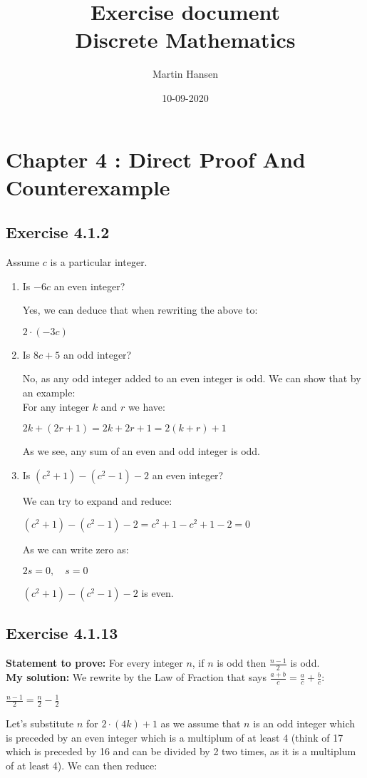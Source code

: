 \documentclass{article}
\author{Martin Hansen}
\date{10-09-2020}
\title{Exercise document \\ \small Discrete Mathematics}
\newcommand{\cent}[1]{\begin{center}#1\end{center}}
\newcommand{\Prove}{\textbf{Statement to prove: }}
\newcommand{\Solution}{\textbf{My solution: }}
\newcommand{\Exercise}[1]{\subsection{Exercise #1}}
\begin{document}
	\maketitle
	
	\pagebreak
	
	\section{Chapter 4 : Direct Proof And Counterexample}
	\Exercise{4.1.2}
	Assume $c$ is a particular integer.
	\begin{enumerate}[label=\textbf{\alph*.}]
		\item Is $-6c$ an even integer?
		
		Yes, we can deduce that when rewriting the above to:
		
		$2\cdot (-3c) $
		
		\item Is $8c+5$ an odd integer?
		
		No, as any odd integer added to an even integer is odd. We can show that by an example:\\
		
		For any integer $k$ and $r$ we have:
		\cent{$2k + (2r+1) = 2k + 2r + 1 = 2(k+r) + 1$}
		
		As we see, any sum of an even and odd integer is odd.
		
		\item Is $(c^2 + 1) - (c^2 - 1) - 2$ an even integer?
		
		We can try to expand and reduce:
		
		\cent{$(c^2 + 1) - (c^2 - 1) - 2 = c^2 + 1 - c^2 + 1 - 2 = 0$}
		
		As we can write zero as:
		
		\cent{$2s = 0, \quad s = 0$}
		
		$(c^2 + 1) - (c^2 - 1) - 2$ is even.
	\end{enumerate}
	
	\Exercise{4.1.13}
	\Prove
	For every integer $n$, if $n$ is odd then $\frac{n-1}{2}$ is odd.\\
	
	\Solution
	We rewrite by the Law of Fraction that says $\frac{a+b}{c} = \frac{a}{c} + \frac{b}{c}$:
	
	\cent{$\frac{n - 1}{2} = \frac{n}{2} - \frac{1}{2}$}
	
	Let's substitute $n$ for $2\cdot (4k) + 1$ as we assume that $n$ is an odd integer which is preceded by an even integer which is a multiplum of at least 4 (think of 17 which is preceded by 16 and can be divided by 2 two times, as it is a multiplum of at least 4). We can then reduce:
	
\end{document}
